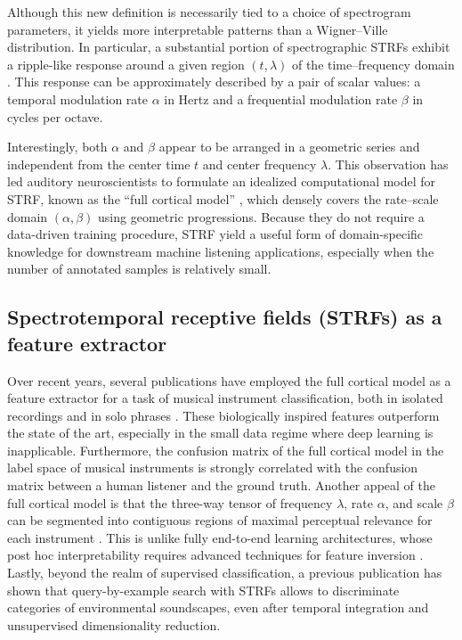 \documentclass{bmcart}
\begin{document}
Although this new definition is necessarily tied to a choice of spectrogram parameters, it yields more interpretable patterns than a Wigner--Ville distribution.
In particular, a substantial portion of spectrographic STRFs exhibit a ripple-like response around a given region $(t, \lambda)$ of the time--frequency domain \cite{theunissen2000jneur}.
This response can be approximately described by a pair of scalar values: a temporal modulation rate $\alpha$ in Hertz and a frequential modulation rate $\beta$ in cycles per octave.

Interestingly, both $\alpha$ and $\beta$ appear to be arranged in a geometric series and independent from the center time $t$ and center frequency $\lambda$.
This observation has led auditory neuroscientists to formulate an idealized computational model for STRF, known as the ``full cortical model'' \cite{chi2005jasa}, which densely covers the rate--scale domain $(\alpha, \beta)$ using geometric progressions.
Because they do not require a data-driven training procedure, STRF yield a useful form of domain-specific knowledge for downstream machine listening applications, especially when the number of annotated samples is relatively small.


\subsection*{Spectrotemporal receptive fields (STRFs) as a feature extractor}
Over recent years, several publications have employed the full cortical model as a feature extractor for a task of musical instrument classification, both in isolated recordings \cite{patil2012ploscompbiol} and in solo phrases \cite{patil2015eurasip}.
These biologically inspired features outperform the state of the art, especially in the small data regime where deep learning is inapplicable.
Furthermore, the confusion matrix of the full cortical model in the label space of musical instruments is strongly correlated with the confusion matrix between a human listener and the ground truth.
Another appeal of the full cortical model is that the three-way tensor of frequency $\lambda$, rate $\alpha$, and scale $\beta$ can be segmented into contiguous regions of maximal perceptual relevance for each instrument \cite{thoret2016jasa}.
This is unlike fully end-to-end learning architectures, whose post hoc interpretability requires advanced techniques for feature inversion \cite{mishra2018ismir}.
Lastly, beyond the realm of supervised classification, a previous publication \cite{hemery2015frontiers} has shown that query-by-example search with STRFs allows to discriminate categories of environmental soundscapes, even after temporal integration and unsupervised dimensionality reduction.
\end{document}
